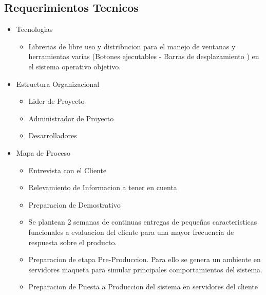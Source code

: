 \documentclass[
10pt, %
a4paper, %
oneside, %
headinclude,footinclude, %
BCOR5mm, %
]{scrartcl}
\begin{document}
\subsection{Requerimientos Tecnicos}
\begin{itemize}
  \item Tecnologias
  \begin{itemize}
    \item Librerias de libre uso y distribucion para el manejo de ventanas
          y herramientas varias (Botones ejecutables - Barras de desplazamiento )
          en el sistema operativo objetivo.
  \end{itemize}

  \item Estructura Organizacional
  \begin{itemize}
    \item Lider de Proyecto
    \item Administrador de Proyecto
    \item Desarrolladores
  \end{itemize}

  \item Mapa de Proceso
  \begin{itemize}
    \item Entrevista con el Cliente
    \item Relevamiento de Informacion a tener en cuenta
    \item Preparacion de Demostrativo
    \item Se plantean 2 semanas de continuas entregas de
            pequeñas caracteristicas funcionales a evaluacion
            del cliente para una mayor frecuencia de respuesta
            sobre el producto.

    \item Preparacion de etapa Pre-Produccion. Para ello se genera un ambiente
            en servidores maqueta para simular principales
            comportamientos del sistema.

    \item Preparacion de Puesta a Produccion del sistema en servidores del cliente
  \end{itemize}
\end{itemize}
\end{document}
